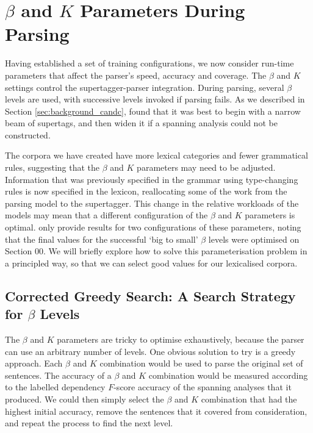 \section{$\beta$ and $K$ Parameters During Parsing}
\label{beta_k}

Having established a set of training configurations, we now consider run-time
parameters that affect the parser's speed, accuracy and coverage. The $\beta$
and $K$ settings control the supertagger-parser integration. During parsing,
several $\beta$ levels are used, with successive levels invoked if parsing
fails. As we described in Section \ref{sec:background_candc}, \citet{clark:cl07}
found that it was best to begin with a narrow beam of supertags, and then widen
it if a spanning analysis could not be constructed.

The corpora we have created have more lexical categories and fewer grammatical
rules, suggesting that the $\beta$ and $K$ parameters may need to be adjusted.
Information that was previously specified in the grammar using type-changing rules is now
specified in the lexicon, reallocating some of the work from the parsing model
to the supertagger. This change in the relative workloads of the models may mean
that a different configuration of the $\beta$ and $K$ parameters is optimal.
\citet{clark:cl07} only provide results for two configurations of these
parameters, noting that the final values for the successful `big to small'
$\beta$ levels were optimised on Section 00. We will briefly explore how to
solve this parameterisation problem in a principled way, so that we can select
good values for our lexicalised corpora.

\subsection{Corrected Greedy Search: A Search Strategy for $\beta$ Levels}

The $\beta$ and $K$ parameters are tricky to optimise exhaustively, because the
parser can use an arbitrary number of levels. One obvious solution to try is a
greedy approach. Each $\beta$ and $K$ combination would be used to parse the
original set of sentences. The accuracy of a $\beta$ and $K$ combination would be
measured according to the labelled dependency $F$-score accuracy of the
spanning analyses that it produced. We could then simply select the $\beta$ and $K$
combination that had the highest initial accuracy, remove the sentences that it
covered from consideration, and repeat the process to find the next level.

